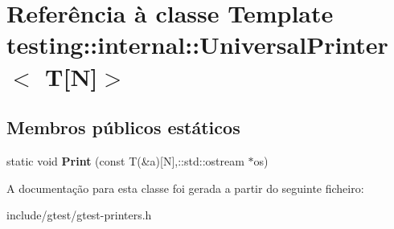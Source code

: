 \hypertarget{classtesting_1_1internal_1_1UniversalPrinter_3_01T[N]_4}{\section{Referência à classe Template testing\-:\-:internal\-:\-:Universal\-Printer$<$ T\mbox{[}N\mbox{]}$>$}
\label{classtesting_1_1internal_1_1UniversalPrinter_3_01T[N]_4}
}
\subsection*{Membros públicos estáticos}
\begin{DoxyCompactItemize}
\item 
\hypertarget{classtesting_1_1internal_1_1UniversalPrinter_3_01T[N]_4_a47e8cb5abce40735db381910513a4721}{static void {\bfseries Print} (const T(\&a)\mbox{[}N\mbox{]},\-::std\-::ostream $\ast$os)}\label{classtesting_1_1internal_1_1UniversalPrinter_3_01T[N]_4_a47e8cb5abce40735db381910513a4721}

\end{DoxyCompactItemize}


A documentação para esta classe foi gerada a partir do seguinte ficheiro\-:\begin{DoxyCompactItemize}
\item 
include/gtest/gtest-\/printers.\-h\end{DoxyCompactItemize}
